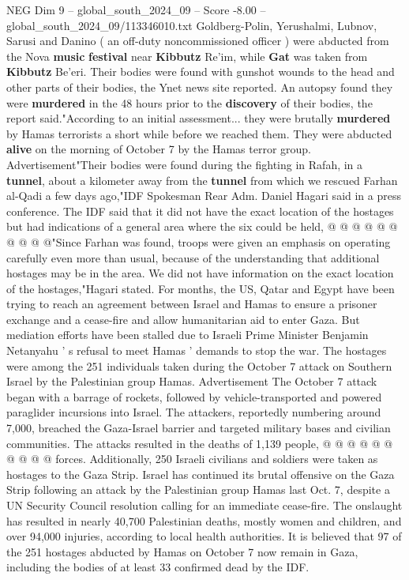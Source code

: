 \begin{textsample}{NEG Dim 9 – global\_south\_2024\_09 – Score -8.00 – global\_south\_2024\_09/113346010.txt}  \label{ex:f9_neg_107}
Goldberg-Polin, Yerushalmi, Lubnov, Sarusi and Danino ( an off-duty noncommissioned officer ) were abducted from the Nova \textbf{music} \textbf{festival} near \textbf{Kibbutz} Re'im, while \textbf{Gat} was taken from \textbf{Kibbutz} Be'eri.
Their bodies were found with gunshot wounds to the head and other parts of their bodies, the Ynet news site reported.
An autopsy found they were \textbf{murdered} in the 48 hours prior to the \textbf{discovery} of their bodies, the report said."According to an initial assessment... they were brutally \textbf{murdered} by Hamas terrorists a short while before we reached them.
They were abducted \textbf{alive} on the morning of October 7 by the Hamas terror group.
Advertisement"Their bodies were found during the fighting in Rafah, in a \textbf{tunnel}, about a kilometer away from the \textbf{tunnel} from which we rescued Farhan al-Qadi a few days ago,"IDF Spokesman Rear Adm.
Daniel Hagari said in a press conference.
The IDF said that it did not have the exact location of the hostages but had indications of a general area where the six could be held, @ @ @ @ @ @ @ @ @ @"Since Farhan was found, troops were given an emphasis on operating carefully even more than usual, because of the understanding that additional hostages may be in the area.
We did not have information on the exact location of the hostages,"Hagari stated.
For months, the US, Qatar and Egypt have been trying to reach an agreement between Israel and Hamas to ensure a prisoner exchange and a cease-fire and allow humanitarian aid to enter Gaza.
But mediation efforts have been stalled due to Israeli Prime Minister Benjamin Netanyahu ' s refusal to meet Hamas ' demands to stop the war.
The hostages were among the 251 individuals taken during the October 7 attack on Southern Israel by the Palestinian group Hamas.
Advertisement The October 7 attack began with a barrage of rockets, followed by vehicle-transported and powered paraglider incursions into Israel.
The attackers, reportedly numbering around 7,000, breached the Gaza-Israel barrier and targeted military bases and civilian communities.
The attacks resulted in the deaths of 1,139 people, @ @ @ @ @ @ @ @ @ @ forces.
Additionally, 250 Israeli civilians and soldiers were taken as hostages to the Gaza Strip.
Israel has continued its brutal offensive on the Gaza Strip following an attack by the Palestinian group Hamas last Oct. 7, despite a UN Security Council resolution calling for an immediate cease-fire.
The onslaught has resulted in nearly 40,700 Palestinian deaths, mostly women and children, and over 94,000 injuries, according to local health authorities.
It is believed that 97 of the 251 hostages abducted by Hamas on October 7 now remain in Gaza, including the bodies of at least 33 confirmed dead by the IDF.

\end{textsample}
